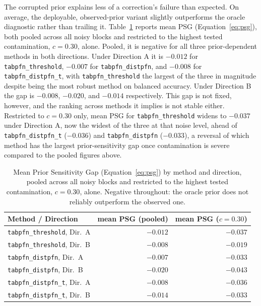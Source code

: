 The corrupted prior explains less of a correction's failure than expected.
On average, the deployable, observed-prior variant slightly outperforms
the oracle diagnostic rather than trailing it. Table~\ref{tab:psg} reports
mean PSG (Equation~\ref{eq:psg}), both pooled across all noisy blocks and
restricted to the highest tested contamination, $c{=}0.30$, alone. Pooled,
it is negative for all three prior-dependent
methods in both directions. Under Direction A it is $-0.012$ for
\texttt{tabpfn\_threshold}, $-0.007$ for \texttt{tabpfn\_distpfn}, and
$-0.008$ for \texttt{tabpfn\_distpfn\_t}, with \texttt{tabpfn\_threshold}
the largest of the three in magnitude despite being the most robust method
on balanced accuracy. Under Direction B the gap is $-0.008$, $-0.020$, and
$-0.014$ respectively. This gap is not fixed, however, and the ranking
across methods it implies is not stable either. Restricted to $c{=}0.30$
only, mean PSG for \texttt{tabpfn\_threshold} widens to $-0.037$ under
Direction A, now the widest of the three at that noise level, ahead of
\texttt{tabpfn\_distpfn\_t} ($-0.036$) and \texttt{tabpfn\_distpfn}
($-0.033$), a reversal of which method has the largest prior-sensitivity
gap once contamination is severe compared to the pooled figures above.

\begin{table}[t]
\centering
\caption{Mean Prior Sensitivity Gap (Equation~\ref{eq:psg}) by method and
direction, pooled across all noisy blocks and restricted to the highest
tested contamination, $c{=}0.30$, alone. Negative throughout: the oracle
prior does not reliably outperform the observed one.}
\label{tab:psg}
\begin{tabular}{@{}lrr@{}}
\toprule
Method / Direction & mean PSG (pooled) & mean PSG ($c{=}0.30$) \\
\midrule
\texttt{tabpfn\_threshold}, Dir.\ A  & $-0.012$ & $-0.037$ \\
\texttt{tabpfn\_threshold}, Dir.\ B  & $-0.008$ & $-0.019$ \\
\texttt{tabpfn\_distpfn}, Dir.\ A    & $-0.007$ & $-0.033$ \\
\texttt{tabpfn\_distpfn}, Dir.\ B    & $-0.020$ & $-0.043$ \\
\texttt{tabpfn\_distpfn\_t}, Dir.\ A & $-0.008$ & $-0.036$ \\
\texttt{tabpfn\_distpfn\_t}, Dir.\ B & $-0.014$ & $-0.033$ \\
\bottomrule
\end{tabular}
\end{table}

